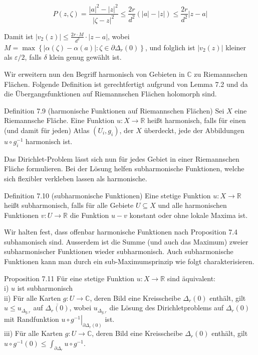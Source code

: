\documentclass[10pt, letterpaper]{article}
\begin{document}
$$
P(z, \zeta)=\frac{|a|^{2}-|z|^{2}}{|\zeta-z|^{2}} \leq \frac{2 r}{d^{2}}(|a|-|z|) \leq \frac{2 r}{d^{2}}|z-a|
$$

Damit ist $\left|v_{2}(z)\right| \leq \frac{2 r \cdot M}{d^{2}} \cdot|z-a|$, wobei $M=\max \left\{|\alpha(\zeta)-\alpha(a)|: \zeta \in \partial \Delta_{r}(0)\right\}$, und folglich ist $\left|v_{2}(z)\right|$ kleiner als $\varepsilon / 2$, falls $\delta$ klein genug gewählt ist.

Wir erweitern nun den Begriff harmonisch von Gebieten in $\mathbb{C}$ zu Riemannschen Flächen. Folgende Definition ist gerechtfertigt aufgrund von Lemma 7.2 und da die Übergangsfunktionen auf Riemannschen Flächen holomorph sind.

Definition 7.9 (harmonische Funktionen auf Riemannschen Flächen) Sei $X$ eine Riemannsche Fläche. Eine Funktion $u: X \rightarrow \mathbb{R}$ heißt harmonisch, falls für einen (und damit für jeden) Atlas $\left(U_{i}, g_{i}\right)$, der $X$ überdeckt, jede der Abbildungen $u \circ g_{i}^{-1}$ harmonisch ist.

Das Dirichlet-Problem lässt sich nun für jedes Gebiet in einer Riemannschen Fläche formulieren. Bei der Lösung helfen subharmonische Funktionen, welche sich flexibler verkleben lassen als harmonische.

Definition 7.10 (subharmonische Funktionen) Eine stetige Funktion $u: X \rightarrow \mathbb{R}$ heißt subharmonisch, falls für alle Gebiete $U \subseteq X$ und alle harmonischen Funktionen $v: U \rightarrow \mathbb{R}$ die Funktion $u-v$ konstant oder ohne lokale Maxima ist.

Wir halten fest, dass offenbar harmonische Funktionen nach Proposition 7.4 subhamonisch sind. Ausserdem ist die Summe (und auch das Maximum) zweier subharmonischer Funktionen wieder subharmonisch. Auch subharmonische Funktionen kann man durch ein sub-Maximumsprinzip wie folgt charakterisieren.

Proposition 7.11 Für eine stetige Funktion $u: X \rightarrow \mathbb{R}$ sind äquivalent:\\
i) $u$ ist subharmonisch\\
ii) Für alle Karten $g: U \rightarrow \mathbb{C}$, deren Bild eine Kreisscheibe $\Delta_{r}(0)$ enthält, gilt $u \leq u_{\Delta_{g, r}}$ auf $\overline{\Delta_{r}(0)}$, wobei $u_{\Delta_{g, r}}$ die Lösung des Dirichletproblems auf $\Delta_{r}(0)$ mit Randfunktion $\left.u \circ g^{-1}\right|_{\partial \Delta_{r}(0)}$ ist.\\
iii) Für alle Karten $g: U \rightarrow \mathbb{C}$, deren Bild eine Kreisscheibe $\Delta_{r}(0)$ enthält, gilt $u \circ g^{-1}(0) \leq \int_{\partial \Delta_{r}} u \circ g^{-1}$.
\end{document}
